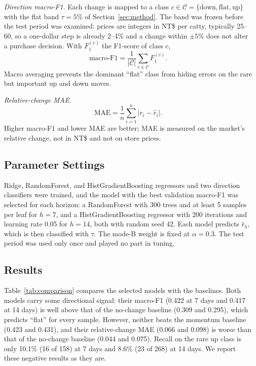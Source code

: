 \textit{Direction macro-F1.} Each change is mapped to a class
$c\in\mathcal{C}=\{\text{down},\text{flat},\text{up}\}$ with the flat band
$\tau=5\%$ of Section~\ref{sec:method}. The band was frozen before the test
period was examined: prices are integers in NT\$ per catty, typically 25--60,
so a one-dollar step is already 2--4\% and a change within $\pm5\%$ does not
alter a purchase decision. With $F_1^{(c)}$ the F1-score of class $c$,
\begin{equation}
\text{macro-F1}=\frac{1}{|\mathcal{C}|}\sum_{c\in\mathcal{C}}F_1^{(c)} .
\label{eq:f1}
\end{equation}
Macro averaging prevents the dominant ``flat'' class from hiding errors on the
rare but important up and down moves.

\textit{Relative-change MAE.}
\begin{equation}
\text{MAE}=\frac{1}{n}\sum_{i=1}^{n}\bigl|r_i-\hat{r}_i\bigr| .
\label{eq:mae}
\end{equation}
Higher macro-F1 and lower MAE are better; MAE is measured on the market's
relative change, not in NT\$ and not on store prices.

\subsection{Parameter Settings}
Ridge, RandomForest, and HistGradientBoosting regressors and two direction
classifiers were trained, and the model with the best validation macro-F1 was
selected for each horizon: a RandomForest with 300 trees and at least 5 samples
per leaf for $h=7$, and a HistGradientBoosting regressor with 200 iterations and
learning rate 0.05 for $h=14$, both with random seed 42. Each model predicts
$\hat{r}_h$, which is then classified with $\tau$. The mode-B weight is fixed at
$\alpha=0.3$. The test period was used only once and played no part in tuning.

\subsection{Results}
Table~\ref{tab:comparison} compares the selected models with the baselines.
Both models carry some directional signal: their macro-F1 (0.422 at 7 days and
0.417 at 14 days) is well above that of the no-change baseline (0.309 and
0.295), which predicts ``flat'' for every sample. However, neither beats the
momentum baseline (0.423 and 0.431), and their relative-change MAE (0.066 and
0.098) is worse than that of the no-change baseline (0.044 and 0.075). Recall on
the rare up class is only 10.1\% (16 of 158) at 7 days and 8.6\% (23 of 268) at
14 days. We report these negative results as they are.

